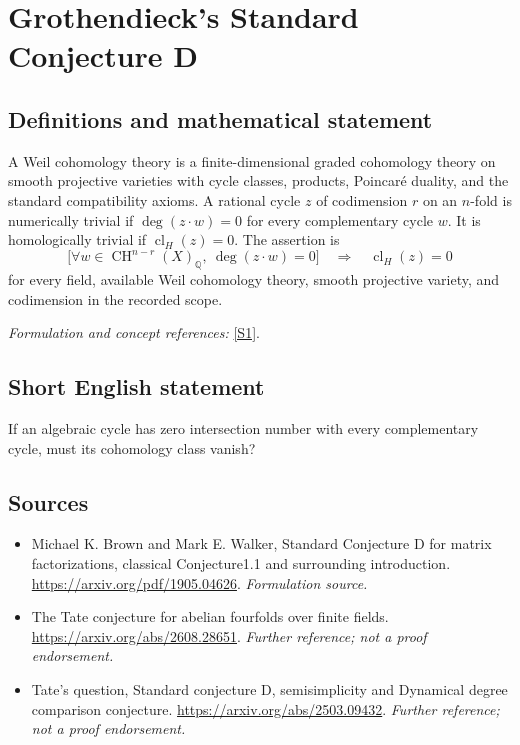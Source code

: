 \documentclass[11pt]{article}
\begin{document}
\section*{\texorpdfstring{Grothendieck's Standard Conjecture D}{Grothendieck's Standard Conjecture D}}\label{statement}
\subsection{Definitions and mathematical statement}
A Weil cohomology theory is a finite-dimensional graded cohomology theory on smooth projective varieties with cycle classes, products, Poincaré duality, and the standard compatibility axioms. A rational cycle $z$ of codimension $r$ on an $n$-fold is numerically trivial if $\deg(z\cdot w)=0$ for every complementary cycle $w$. It is homologically trivial if $\operatorname{cl}_H(z)=0$. The assertion is
\[
 \bigl[\forall w\in\operatorname{CH}^{n-r}(X)_{{\mathbb{Q}}},\ \deg(z\cdot w)=0\bigr]
 \quad\Longrightarrow\quad \operatorname{cl}_H(z)=0
\]
for every field, available Weil cohomology theory, smooth projective variety, and codimension in the recorded scope.
\par\smallskip\textit{Formulation and concept references:} \href{https://arxiv.org/pdf/1905.04626}{[S1]}.

\subsection{Short English statement}
If an algebraic cycle has zero intersection number with every complementary cycle, must its cohomology class vanish?
\subsection{Sources}
\begin{itemize}
\item[S1]Michael K. Brown and Mark E. Walker, Standard Conjecture D for matrix factorizations, classical Conjecture1.1 and surrounding introduction.
\url{https://arxiv.org/pdf/1905.04626}.
\textit{Formulation source.}
\item[S2]The Tate conjecture for abelian fourfolds over finite fields.
\url{https://arxiv.org/abs/2608.28651}.
\textit{Further reference; not a proof endorsement.}
\item[S3]Tate's question, Standard conjecture D, semisimplicity and Dynamical degree comparison conjecture.
\url{https://arxiv.org/abs/2503.09432}.
\textit{Further reference; not a proof endorsement.}
\end{itemize}
\end{document}
